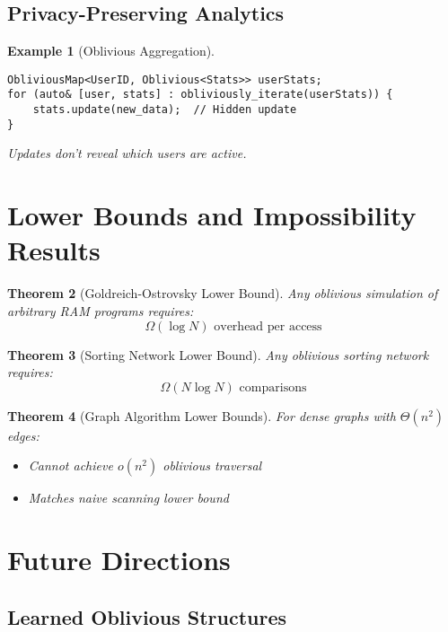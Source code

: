 \documentclass[11pt,final]{article}
\newtheorem{theorem}{Theorem}[section]
\newtheorem{example}[theorem]{Example}
\begin{document}
\subsection{Privacy-Preserving Analytics}

\begin{example}[Oblivious Aggregation]
\begin{verbatim}
ObliviousMap<UserID, Oblivious<Stats>> userStats;
for (auto& [user, stats] : obliviously_iterate(userStats)) {
    stats.update(new_data);  // Hidden update
}
\end{verbatim}
Updates don't reveal which users are active.
\end{example}

\section{Lower Bounds and Impossibility Results}

\begin{theorem}[Goldreich-Ostrovsky Lower Bound]
Any oblivious simulation of arbitrary RAM programs requires:
\begin{equation}
\Omega(\log N) \text{ overhead per access}
\end{equation}
\end{theorem}

\begin{theorem}[Sorting Network Lower Bound]
Any oblivious sorting network requires:
\begin{equation}
\Omega(N \log N) \text{ comparisons}
\end{equation}
\end{theorem}

\begin{theorem}[Graph Algorithm Lower Bounds]
For dense graphs with $\Theta(n^2)$ edges:
\begin{itemize}
    \item Cannot achieve $o(n^2)$ oblivious traversal
    \item Matches naive scanning lower bound
\end{itemize}
\end{theorem}

\section{Future Directions}

\subsection{Learned Oblivious Structures}
\end{document}

